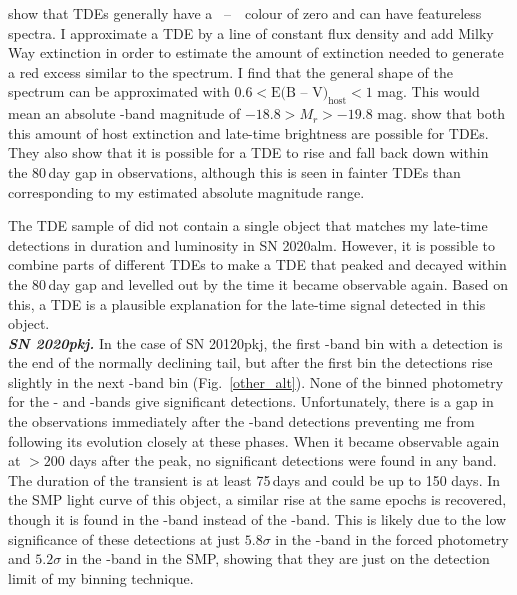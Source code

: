 \documentclass[a4paper,oneside,12pt, class=Latex/Classes/PhDthesisPSnPDF, crop=false]{standalone}
\begin{document}
\citet{TDE_host_ext_range} show that TDEs generally have a \ztfg~--~\ztfr~colour of zero and can have featureless spectra. I approximate a TDE by a line of constant flux density and add Milky Way extinction \citep[using the SFD89 dust maps in the direction of the object;][]{SFD98_dust_maps} in order to estimate the amount of extinction needed to generate a red excess similar to the spectrum. I find that the general shape of the spectrum can be approximated with $0.6 < \text{E(B -- V)}_\text{host} < 1$ mag. This would mean an absolute \ztfr-band magnitude of $-18.8 > M_r > -19.8$ mag. \citet{TDE_host_ext_range} show that both this amount of host extinction and late-time brightness are possible for TDEs. They also show that it is possible for a TDE to rise and fall back down within the 80\,day gap in observations, although this is seen in fainter TDEs than corresponding to my estimated absolute magnitude range.

The TDE sample of \citet{TDE_host_ext_range} did not contain a single object that matches my late-time detections in duration and luminosity in SN 2020alm. However, it is possible to combine parts of different TDEs to make a TDE that peaked and decayed within the 80\,day gap and levelled out by the time it became observable again. Based on this, a TDE is a plausible explanation for the late-time signal detected in this object.\\


\textit{\textbf{SN 2020pkj.}}
In the case of SN 20120pkj, the first \ztfr-band bin with a detection is the end of the normally declining tail, but after the first bin the detections rise slightly in the next \ztfr-band bin (Fig.~\ref{other_alt}). None of the binned photometry for the \ztfg- and \ztfi-bands give significant detections. Unfortunately, there is a gap in the observations immediately after the \ztfr-band detections preventing me from following its evolution closely at these phases. When it became observable again at $>200$ days after the peak, no significant detections were found in any band. The duration of the transient is at least 75\,days and could be up to 150 days. In the SMP light curve of this object, a similar rise at the same epochs is recovered, though it is found in the \ztfg-band instead of the \ztfr-band. This is likely due to the low significance of these detections at just $5.8\sigma$ in the \ztfr-band in the forced photometry and $5.2\sigma$ in the \ztfg-band in the SMP, showing that they are just on the detection limit of my binning technique.
\end{document}
